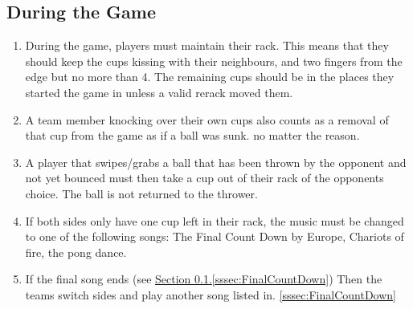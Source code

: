 	\subsection{During the Game}\label{ssec:DuringGame}
		\begin{enumerate}[label=(\roman*)]
            \item \label{sssec:MaintainRack} During the game, players must maintain their rack.
                This means that they should keep the cups kissing with their neighbours, and two fingers from the edge but no more than 4.
                The remaining cups should be in the places they started the game in unless a valid rerack moved them.
            \item \label{sssec:Knockover} A team member knocking over their own cups also counts as a removal of that cup from the game as if a ball was sunk. no matter the reason.
            \item \label{sssec:swiping_no_bounce} A player that swipes/grabs a ball that has been thrown by the opponent and not yet bounced must then take a cup out of their rack of the opponents choice.
                The ball is not returned to the thrower.
            \item \label{sssec:FinalCountDown} If both sides only have one cup left in their rack, the music must be changed to one of the following songs: The Final Count Down by Europe, Chariots of fire, the pong dance.
            \item \label{sssec:finalSongEnd} If the final song ends (see \hyperref[sssec:FinalCountDown]{Section \ref{ssec:DuringGame}.\ref{sssec:FinalCountDown}}) Then the teams switch sides and play another song listed in. \ref{sssec:FinalCountDown}
        \end{enumerate}
